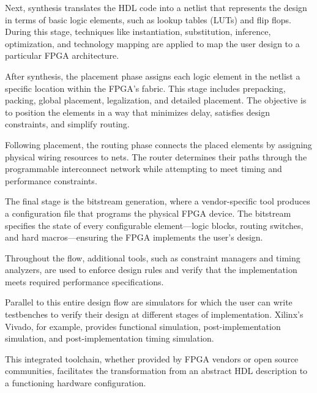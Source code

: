 \documentclass[twocolumn]{article}
\begin{document}
    Next, synthesis translates the HDL code into a netlist that represents the design in terms of basic logic elements, such as lookup tables (LUTs) and flip flops. 
    During this stage, techniques like instantiation, substitution, inference, optimization, and technology mapping are applied to map the user design to a particular FPGA architecture.

    After synthesis, the placement phase assigns each logic element in the netlist a specific location within the FPGA’s fabric. 
    This stage includes prepacking, packing, global placement, legalization, and detailed placement. 
    The objective is to position the elements in a way that minimizes delay, satisfies design constraints, and simplify routing. 

    Following placement, the routing phase connects the placed elements by assigning physical wiring resources to nets. 
    The router determines their paths through the programmable interconnect network while attempting to meet timing and performance constraints.

    The final stage is the bitstream generation, where a vendor-specific tool produces a configuration file that programs the physical FPGA device. 
    The bitstream specifies the state of every configurable element—logic blocks, routing switches, and hard macros—ensuring the FPGA implements the user's design.

    Throughout the flow, additional tools, such as constraint managers and timing analyzers, are used to enforce design rules and verify that the implementation meets required performance specifications. 

    Parallel to this entire design flow are simulators for which the user can write testbenches to verify their design at different stages of implementation.
    Xilinx's Vivado, for example, provides functional simulation, post-implementation simulation, and post-implementation timing simulation.

    This integrated toolchain, whether provided by FPGA vendors or open source communities, facilitates the transformation from an abstract HDL description to a functioning hardware configuration.
\end{document}
